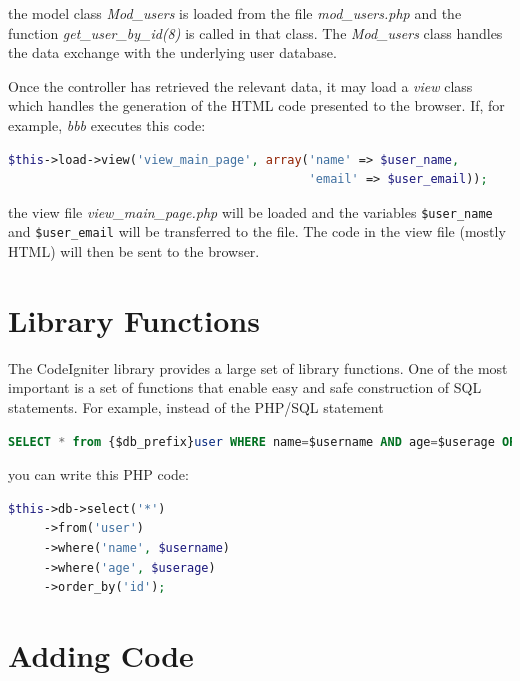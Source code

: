 \documentclass[11pt,oneside,a4paper]{memoir}
\begin{document}
\noindent
the model class \emph{Mod\_users} is loaded from the file \emph{mod\_users.php} and the function
\emph{get\_\-user\_\-by\_\-id(8)} is called in that class. The \emph{Mod\_users} class handles the data
exchange with the underlying user database.

Once the controller has retrieved the relevant data, it may load a \emph{view} class which handles
the generation of the HTML code presented to the browser. If, for example, \emph{bbb} executes
this code:

\begin{lstlisting}[language=PHP]
$this->load->view('view_main_page', array('name' => $user_name,
                                          'email' => $user_email));
\end{lstlisting}

\noindent
the view file \emph{view\_main\_page.php} will be loaded and the variables \texttt{\$user\_name} and
\texttt{\$user\_email} will be transferred to the file. The code in the view file (mostly HTML) will
then be sent to the browser.

\section{Library Functions}

The CodeIgniter library provides a large set of library functions. One of the most important is a
set of functions that enable easy and safe construction of SQL statements. For example,
instead of the PHP/SQL statement

\begin{lstlisting}[language=SQL]
SELECT * from {$db_prefix}user WHERE name=$username AND age=$userage ORDER BY id;
\end{lstlisting}

\noindent
you can write this PHP code:

\begin{lstlisting}[language=PHP]
$this->db->select('*')
     ->from('user')
     ->where('name', $username)
     ->where('age', $userage)
     ->order_by('id');
\end{lstlisting}

\section{Adding Code}
\end{document}
